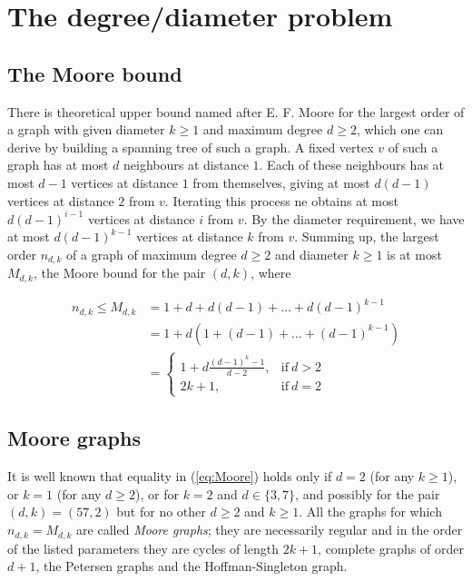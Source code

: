 \documentclass[a4paper,12pt,oneside]{report}%
\begin{document}
\section{The degree/diameter problem}
\subsection{The Moore bound}

There is theoretical upper bound named after E. F. Moore for the largest order of a graph with given diameter $k\ge 1$ and maximum degree $d\ge 2$, which one can derive by building a spanning tree of such a graph. A fixed vertex $v$ of such a graph has at most $d$ neighbours at distance $1$. Each of these neighbours has at most $d-1$ vertices at distance $1$ from themselves, giving at most $d(d-1)$ vertices at distance $2$ from $v$. Iterating this process ne obtains at most $d(d-1)^{i-1}$ vertices at distance $i$ from $v$. By the diameter requirement, we have at most $d(d-1)^{k-1}$ vertices at distance $k$ from $v$. Summing up, the largest order $n_{d,k}$ of a graph of maximum degree $d\ge 2$ and diameter $k\ge 1$ is at most $M_{d,k}$, the Moore bound for the pair $(d,k)$, where

\begin{equation}\label{eq:Moore}
	\begin{split}
		n_{d,k} \leq M_{d,k}	& = 1 + d + d(d - 1) + \dots + d(d - 1)^{k-1}  \\
				 				& = 1 + d(1 + (d - 1) + \dots + (d - 1)^{k-1}) \\
				 				& =	\begin{cases}
										1+d\frac{(d-1)^{k}-1}{d-2}, & \text{if}\ d > 2 \\
										2k+1, & \text{if}\ d=2
									\end{cases}
	\end{split}
\end{equation}

\subsection{Moore graphs}
It is well known that equality in (\ref{eq:Moore}) holds only if $d=2$ (for any $k\ge 1$), or $k=1$ (for any $d\ge 2$), or for $k=2$ and $d\in \{3,7\}$, and possibly for the pair $(d,k)=(57,2)$ but for no other $d\ge 2$ and $k\ge 1$. All the graphs for which $n_{d,k}=M_{d,k}$ are called {\em Moore graphs}; they are necessarily regular and in the order of the listed parameters they are cycles of length $2k+1$, complete graphs of order $d+1$, the Petersen graphs and the Hoffman-Singleton graph.
\medskip
\end{document}
